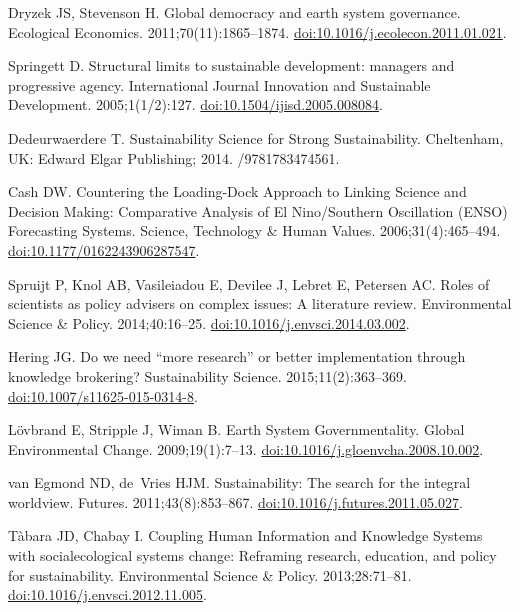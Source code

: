 \documentclass[10pt,a4paper]{article}
\begin{document}
\begin{multicols}{2}
\begin{footnotesize}
\begin{thebibliography}{10}
Dryzek JS, Stevenson H.
\newblock Global democracy and earth system governance.
\newblock Ecological Economics. 2011;70(11):1865--1874.
\newblock
  \href{https://doi.org/10.1016/j.ecolecon.2011.01.021}{doi:10.1016/j.ecolecon.2011.01.021}.

Springett D.
\newblock Structural limits to sustainable development: managers and
  progressive agency.
\newblock International Journal Innovation and Sustainable Development.
  2005;1(1/2):127.
\newblock
  \href{https://doi.org/10.1504/ijisd.2005.008084}{doi:10.1504/ijisd.2005.008084}.

Dedeurwaerdere T.
\newblock Sustainability Science for Strong Sustainability.
\newblock Cheltenham, UK: Edward Elgar Publishing; 2014.
/9781783474561.

Cash DW.
\newblock Countering the Loading-Dock Approach to Linking Science and Decision
  Making: Comparative Analysis of El Nino/Southern Oscillation ({ENSO})
  Forecasting Systems.
\newblock Science, Technology {\&} Human Values. 2006;31(4):465--494.
\newblock
  \href{https://doi.org/10.1177/0162243906287547}{doi:10.1177/0162243906287547}.

Spruijt P, Knol AB, Vasileiadou E, Devilee J, Lebret E, Petersen AC.
\newblock Roles of scientists as policy advisers on complex issues: A
  literature review.
\newblock Environmental Science {\&} Policy. 2014;40:16--25.
\newblock
  \href{https://doi.org/10.1016/j.envsci.2014.03.002}{doi:10.1016/j.envsci.2014.03.002}.

Hering JG.
\newblock Do we need {\textquotedblleft}more research{\textquotedblright} or
  better implementation through knowledge brokering?
\newblock Sustainability Science. 2015;11(2):363--369.
\newblock
  \href{https://doi.org/10.1007/s11625-015-0314-8}{doi:10.1007/s11625-015-0314-8}.

Lövbrand E, Stripple J, Wiman B.
\newblock Earth System Governmentality.
\newblock Global Environmental Change. 2009;19(1):7--13.
\newblock
  \href{https://doi.org/10.1016/j.gloenvcha.2008.10.002}{doi:10.1016/j.gloenvcha.2008.10.002}.

van Egmond ND, de~Vries HJM.
\newblock Sustainability: The search for the integral worldview.
\newblock Futures. 2011;43(8):853--867.
\newblock
  \href{https://doi.org/10.1016/j.futures.2011.05.027}{doi:10.1016/j.futures.2011.05.027}.

T{\`{a}}bara JD, Chabay I.
\newblock Coupling Human Information and Knowledge Systems with
  social{\textendash}ecological systems change: Reframing research, education,
  and policy for sustainability.
\newblock Environmental Science {\&} Policy. 2013;28:71--81.
\newblock
  \href{https://doi.org/10.1016/j.envsci.2012.11.005}{doi:10.1016/j.envsci.2012.11.005}.


\end{thebibliography}
\end{footnotesize}
\end{multicols}
\end{document}
